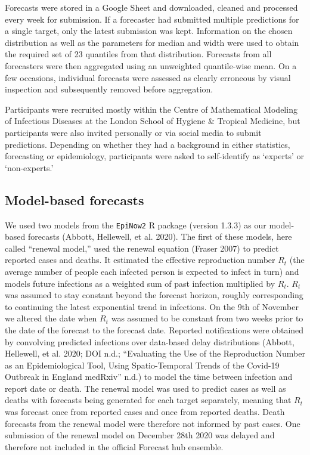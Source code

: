\documentclass[
]{article}
\begin{document}
Forecasts were stored in a Google Sheet and downloaded, cleaned and processed every week for submission. If a forecaster had submitted multiple predictions for a single target, only the latest submission was kept. Information on the chosen distribution as well as the parameters for median and width were used to obtain the required set of 23 quantiles from that distribution. Forecasts from all forecasters were then aggregated using an unweighted quantile-wise mean. On a few occasions, individual forecasts were assessed as clearly erroneous by visual inspection and subsequently removed before aggregation.

Participants were recruited mostly within the Centre of Mathematical Modeling of Infectious Diseases at the London School of Hygiene \& Tropical Medicine, but participants were also invited personally or via social media to submit predictions. Depending on whether they had a background in either statistics, forecasting or epidemiology, participants were asked to self-identify as `experts' or `non-experts.'

\hypertarget{model-based-forecasts}{%
\subsection{Model-based forecasts}\label{model-based-forecasts}}

We used two models from the \texttt{EpiNow2} R package (version 1.3.3) as our model-based forecasts (Abbott, Hellewell, et al. 2020). The first of these models, here called ``renewal model,'' used the renewal equation (Fraser 2007) to predict reported cases and deaths. It estimated the effective reproduction number \(R_t\) (the average number of people each infected person is expected to infect in turn) and models future infections as a weighted sum of past infection multiplied by \(R_t\). \(R_t\) was assumed to stay constant beyond the forecast horizon, roughly corresponding to continuing the latest exponential trend in infections. On the 9th of November we altered the date when \(R_t\) was assumed to be constant from two weeks prior to the date of the forecast to the forecast date. Reported notifications were obtained by convolving predicted infections over data-based delay distributions (Abbott, Hellewell, et al. 2020; DOI n.d.; {``Evaluating the Use of the Reproduction Number as an Epidemiological Tool, Using Spatio-Temporal Trends of the {Covid}-19 Outbreak in {England} \textbar{} {medRxiv}''} n.d.) to model the time between infection and report date or death. The renewal model was used to predict cases as well as deaths with forecasts being generated for each target separately, meaning that \(R_t\) was forecast once from reported cases and once from reported deaths. Death forecasts from the renewal model were therefore not informed by past cases. One submission of the renewal model on December 28th 2020 was delayed and therefore not included in the official Forecast hub ensemble.
\end{document}
